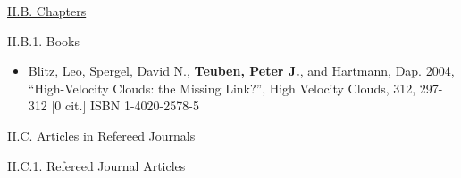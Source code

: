 \documentclass[11pt,letterpaper]{article}
\begin{document}






\underline{II.B. Chapters}

II.B.1. Books

\begin{itemize}
\item[]
Blitz, Leo, Spergel, David N., {\bf Teuben, Peter J.}, and Hartmann, Dap.  2004,  
``High-Velocity Clouds: the Missing Link?'', High Velocity Clouds,  312,  
297-312 [0 cit.] ISBN 1-4020-2578-5
\end{itemize}







\underline{II.C. Articles in Refereed Journals}


II.C.1. Refereed Journal Articles
\end{document}
